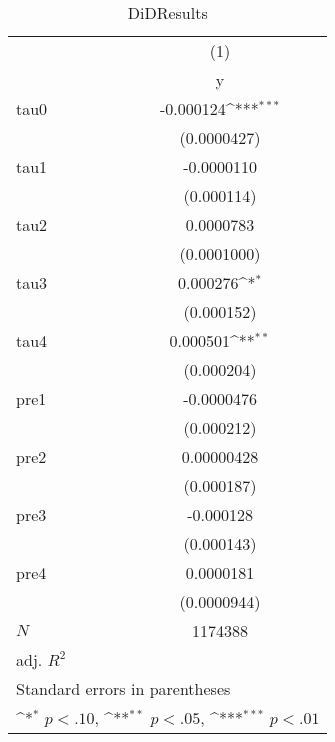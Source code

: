 \begin{table}[htbp]\centering
\def\sym#1{\ifmmode^{#1}\else\(^{#1}\)\fi}
\caption{DiDResults}
\begin{tabular}{l*{1}{c}}
\hline\hline
            &\multicolumn{1}{c}{(1)}\\
            &\multicolumn{1}{c}{y}\\
\hline
tau0        &   -0.000124\sym{***}\\
            & (0.0000427)         \\
[1em]
tau1        &  -0.0000110         \\
            &  (0.000114)         \\
[1em]
tau2        &   0.0000783         \\
            & (0.0001000)         \\
[1em]
tau3        &    0.000276\sym{*}  \\
            &  (0.000152)         \\
[1em]
tau4        &    0.000501\sym{**} \\
            &  (0.000204)         \\
[1em]
pre1        &  -0.0000476         \\
            &  (0.000212)         \\
[1em]
pre2        &  0.00000428         \\
            &  (0.000187)         \\
[1em]
pre3        &   -0.000128         \\
            &  (0.000143)         \\
[1em]
pre4        &   0.0000181         \\
            & (0.0000944)         \\
\hline
\(N\)       &     1174388         \\
adj. \(R^{2}\)&                     \\
\hline\hline
\multicolumn{2}{l}{\footnotesize Standard errors in parentheses}\\
\multicolumn{2}{l}{\footnotesize \sym{*} \(p<.10\), \sym{**} \(p<.05\), \sym{***} \(p<.01\)}\\
\end{tabular}
\end{table}
